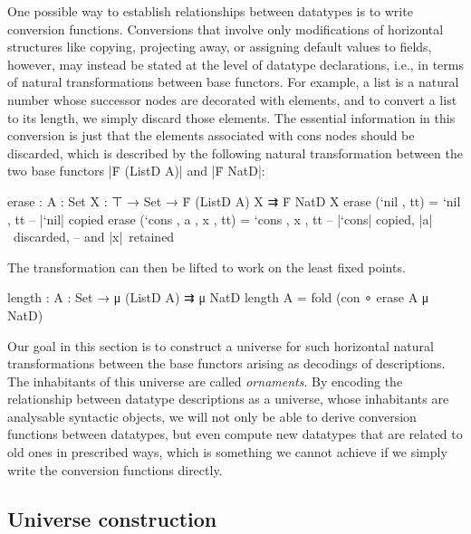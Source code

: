 One possible way to establish relationships between datatypes is to write conversion functions.
Conversions that involve only modifications of horizontal structures like copying, projecting away, or assigning default values to fields, however, may instead be stated at the level of datatype declarations, i.e., in terms of natural transformations between base functors.
For example, a list is a natural number whose successor nodes are decorated with elements, and to convert a list to its length, we simply discard those elements.
The essential information in this conversion is just that the elements associated with cons nodes should be discarded, which is described by the following natural transformation between the two base functors |Ḟ (ListD A)| and |Ḟ NatD|:
\begin{code}
erase : {A : Set} {X : ⊤ → Set} → Ḟ (ListD A) X ⇉ Ḟ NatD X
erase (`nil   ,          tt)  =  `nil   ,       tt  -- |`nil| copied
erase (`cons  , a , x ,  tt)  =  `cons  ,  x ,  tt   -- |`cons| copied, |a|~discarded,
                                                     -- and |x|~retained
\end{code}
The transformation can then be lifted to work on the least fixed points.
\begin{code}
length : {A : Set} → μ (ListD A) ⇉ μ NatD
length {A} = fold (con ∘ erase {A} {μ NatD})
\end{code}
Our goal in this section is to construct a universe for such horizontal natural transformations between the base functors arising as decodings of descriptions.
The inhabitants of this universe are called \emph{ornaments}.
By encoding the relationship between datatype descriptions as a universe, whose inhabitants are analysable syntactic objects, we will not only be able to derive conversion functions between datatypes, but even compute new datatypes that are related to old ones in prescribed ways, which is something we cannot achieve if we simply write the conversion functions directly.

\subsection{Universe construction}

